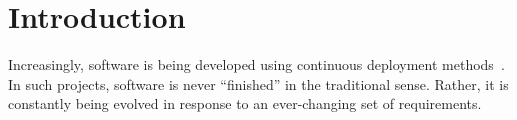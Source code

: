 \documentclass[sigconf,anonymous,review]{acmart}
\begin{document}

\renewcommand\footnotetextcopyrightpermission[1]{} %




\maketitle

\section{Introduction}
\label{sect:intro}
Increasingly,  software is being developed using   continuous deployment methods~\cite{Paasivaara18,santos2016investigating,Hohl18,Parnin17}.
In such projects, software is never ``finished'' in the traditional sense. Rather,
it is  constantly being evolved in response to an ever-changing set of
requirements. 
\end{document}
